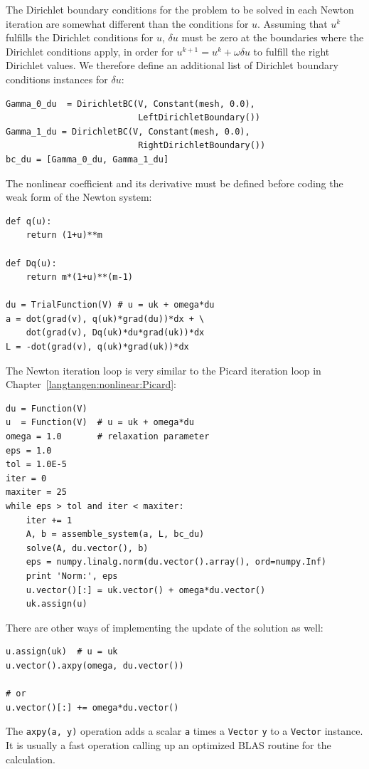 The Dirichlet boundary conditions for the problem to be solved in each Newton
iteration are somewhat different than the conditions for $u$.
Assuming that $u^k$ fulfills the
Dirichlet conditions for $u$, $\delta u$ must be zero at the boundaries
where the Dirichlet conditions apply, in order for $u^{k+1}=u^k + \omega\delta u$ to fulfill
the right Dirichlet values. We therefore define an additional list of
Dirichlet boundary conditions instances for $\delta u$:
\begin{Verbatim}[fontsize=\fontsize{10pt}{10pt},tabsize=8,baselinestretch=1.05,
fontfamily=tt,xleftmargin=7mm]
Gamma_0_du  = DirichletBC(V, Constant(mesh, 0.0),
                          LeftDirichletBoundary())
Gamma_1_du = DirichletBC(V, Constant(mesh, 0.0),
                          RightDirichletBoundary())
bc_du = [Gamma_0_du, Gamma_1_du]
\end{Verbatim}
\noindent
The nonlinear coefficient and its derivative must be defined
before coding the weak form of the Newton system:
\begin{Verbatim}[fontsize=\fontsize{10pt}{10pt},tabsize=8,baselinestretch=1.05,
fontfamily=tt,xleftmargin=7mm]
def q(u):
    return (1+u)**m

def Dq(u):
    return m*(1+u)**(m-1)

du = TrialFunction(V) # u = uk + omega*du
a = dot(grad(v), q(uk)*grad(du))*dx + \
    dot(grad(v), Dq(uk)*du*grad(uk))*dx
L = -dot(grad(v), q(uk)*grad(uk))*dx
\end{Verbatim}
\noindent

The Newton iteration loop is very similar to the Picard iteration loop
in Chapter~\ref{langtangen:nonlinear:Picard}:
\begin{Verbatim}[fontsize=\fontsize{10pt}{10pt},tabsize=8,baselinestretch=1.05,
fontfamily=tt,xleftmargin=7mm]
du = Function(V)
u  = Function(V)  # u = uk + omega*du
omega = 1.0       # relaxation parameter
eps = 1.0
tol = 1.0E-5
iter = 0
maxiter = 25
while eps > tol and iter < maxiter:
    iter += 1
    A, b = assemble_system(a, L, bc_du)
    solve(A, du.vector(), b)
    eps = numpy.linalg.norm(du.vector().array(), ord=numpy.Inf)
    print 'Norm:', eps
    u.vector()[:] = uk.vector() + omega*du.vector()
    uk.assign(u)
\end{Verbatim}
\noindent
There are other ways of implementing the
update of the solution as well:
\begin{Verbatim}[fontsize=\fontsize{10pt}{10pt},tabsize=8,baselinestretch=1.05,
fontfamily=tt,xleftmargin=7mm]
u.assign(uk)  # u = uk
u.vector().axpy(omega, du.vector())

# or
u.vector()[:] += omega*du.vector()
\end{Verbatim}
\noindent
The {\fontsize{12pt}{12pt}\texttt{axpy(a, y)}} operation adds a scalar {\fontsize{12pt}{12pt}\texttt{a}} times a {\fontsize{12pt}{12pt}\texttt{Vector}}
{\fontsize{12pt}{12pt}\texttt{y}} to a {\fontsize{12pt}{12pt}\texttt{Vector}} instance.  It is usually a fast operation
calling up an optimized BLAS routine for the calculation.

